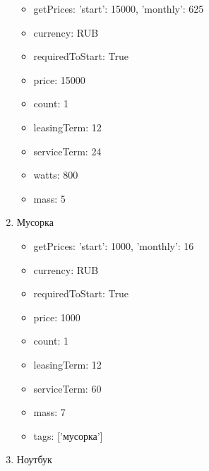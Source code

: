 \documentclass[a4paper,12pt]{article}
\begin{document}
\begin{enumerate}
\begin{itemize}
          \item getPrices: {'start': 15000, 'monthly': 625}
        
          \item currency: RUB
        
          \item requiredToStart: True
        
          \item price: 15000
        
          \item count: 1
        
          \item leasingTerm: 12
        
          \item serviceTerm: 24
        
          \item watts: 800
        
          \item mass: 5
        
        \end{itemize}
      
      \item Мусорка
        \begin{itemize}
        
          \item getPrices: {'start': 1000, 'monthly': 16}
        
          \item currency: RUB
        
          \item requiredToStart: True
        
          \item price: 1000
        
          \item count: 1
        
          \item leasingTerm: 12
        
          \item serviceTerm: 60
        
          \item mass: 7
        
          \item tags: ['мусорка']
        
        \end{itemize}
      
      \item Ноутбук
        \begin{itemize}
        

\end{itemize}
\end{enumerate}
\end{document}
